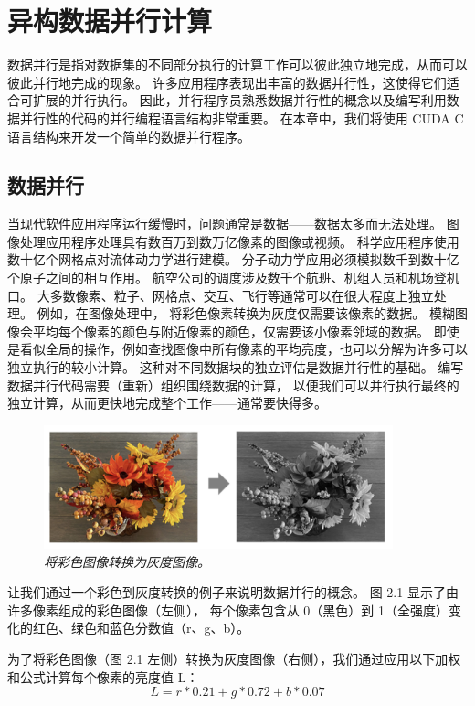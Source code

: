 \section{异构数据并行计算}

数据并行是指对数据集的不同部分执行的计算工作可以彼此独立地完成，从而可以彼此并行地完成的现象。 
许多应用程序表现出丰富的数据并行性，这使得它们适合可扩展的并行执行。 
因此，并行程序员熟悉数据并行性的概念以及编写利用数据并行性的代码的并行编程语言结构非常重要。 
在本章中，我们将使用 CUDA C 语言结构来开发一个简单的数据并行程序。

\subsection{数据并行}
当现代软件应用程序运行缓慢时，问题通常是数据——数据太多而无法处理。 
图像处理应用程序处理具有数百万到数万亿像素的图像或视频。 科学应用程序使用数十亿个网格点对流体动力学进行建模。 
分子动力学应用必须模拟数千到数十亿个原子之间的相互作用。 航空公司的调度涉及数千个航班、机组人员和机场登机口。 
大多数像素、粒子、网格点、交互、飞行等通常可以在很大程度上独立处理。 例如，在图像处理中，
将彩色像素转换为灰度仅需要该像素的数据。 模糊图像会平均每个像素的颜色与附近像素的颜色，仅需要该小像素邻域的数据。 
即使是看似全局的操作，例如查找图像中所有像素的平均亮度，也可以分解为许多可以独立执行的较小计算。 
这种对不同数据块的独立评估是数据并行性的基础。 编写数据并行代码需要（重新）组织围绕数据的计算，
以便我们可以并行执行最终的独立计算，从而更快地完成整个工作——通常要快得多。
\begin{figure}[H]
	\centering
	\includegraphics[width=0.9\textwidth]{figs/F2.1.png}
	\caption{\textit{将彩色图像转换为灰度图像。}}
\end{figure}

让我们通过一个彩色到灰度转换的例子来说明数据并行的概念。 图 2.1 显示了由许多像素组成的彩色图像（左侧），
每个像素包含从 0（黑色）到 1（全强度）变化的红色、绿色和蓝色分数值（r、g、b）。

为了将彩色图像（图 2.1 左侧）转换为灰度图像（右侧），我们通过应用以下加权和公式计算每个像素的亮度值 L：
\begin{equation*}
	L = r*0.21 + g*0.72 + b * 0.07
\end{equation*}

